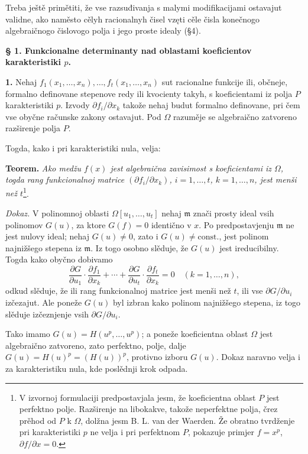 \documentclass[11pt]{article}
\begin{document}
Treba ještě primětiti, že vse razsuđivanja s malymi modifikacijami ostavajut validne, ako naměsto cělyh racionalnyh čisel vzęti cěle čisla konečnogo algebraičnogo čislovogo polja i jego proste idealy (§4).

\bigskip
\noindent\textbf{§ 1. Funkcionalne determinanty nad oblastami koeficientov karakteristiki \(p\).}

\smallskip
\noindent\textbf{1.}
Nehaj \(f_1(x_1,\ldots,x_n),\ldots,f_t(x_1,\ldots,x_n)\) sut racionalne funkcije ili, občneje, formalno definovane stepenove redy ili kvocienty takyh, s koeficientami iz polja \(P\) karakteristiki \(p\). Izvody \(\partial f_i/\partial x_k\) takože nehaj budut formalno definovane, pri čem vse obyčne računske zakony ostavajut. Pod \(\Omega\) razuměje se algebraično zatvoreno razširenje polja \(P\).

Togda, kako i pri karakteristiki nula, velja:

\noindent\textbf{Teorem.}
\textit{Ako medžu \(f(x)\) jest algebraična zavisimost s koeficientami iz \(\Omega\), togda rang funkcionalnoj matrice \((\partial f_i/\partial x_k)\), \(i=1,\ldots,t\), \(k=1,\ldots,n\), jest menši než \(t\)}\footnote{V izvornoj formulaciji predpostavjala jesm, že koeficientna oblast \(P\) jest perfektno polje. Razširenje na libokakve, takože neperfektne polja, črez prěhod od \(P\) k \(\Omega\), dolžna jesm B. L. van der Waerden. Že obratno tvrdženje pri karakteristiki \(p\) ne velja i pri perfektnom \(P\), pokazuje primjer \(f=x^p\), \(\partial f/\partial x=0\).}.

\noindent\textit{Dokaz.}
V polinomnoj oblasti \(\Omega[u_1,\ldots,u_t]\) nehaj \(\mathfrak{m}\) znači prosty ideal vsih polinomov \(G(u)\), za ktore \(G(f)=0\) identično v \(x\). Po predpostavjenju \(\mathfrak{m}\) ne jest nulovy ideal; nehaj \(G(u)\ne0\), zato i \(G(u)\ne\mathrm{const.}\), jest polinom najnižšego stepena iz \(\mathfrak{m}\). Iz togo osobno slěduje, že \(G(u)\) jest ireducibilny. Togda kako obyčno dobivamo
\[
\frac{\partial G}{\partial u_1}\cdot\frac{\partial f_1}{\partial x_k}
+\cdots+
\frac{\partial G}{\partial u_t}\cdot\frac{\partial f_t}{\partial x_k}=0
\quad(k=1,\ldots,n),
\]
odkud slěduje, že ili rang funkcionalnoj matrice jest menši než \(t\), ili vse \(\partial G/\partial u_i\) izčezajut. Ale poneže \(G(u)\) byl izbran kako polinom najnižšego stepena, iz togo slěduje izčeznjenje vsih \(\partial G/\partial u_i\).

Tako imamo \(G(u)=H(u^p,\ldots,u^p)\); a poneže koeficientna oblast \(\Omega\) jest algebraično zatvoreno, zato perfektno, polje, dalje \(G(u)=H(u)^p=(H(u))^p\), protivno izboru \(G(u)\). Dokaz naravno velja i za karakteristiku nula, kde poslědnji krok odpada.
\end{document}
